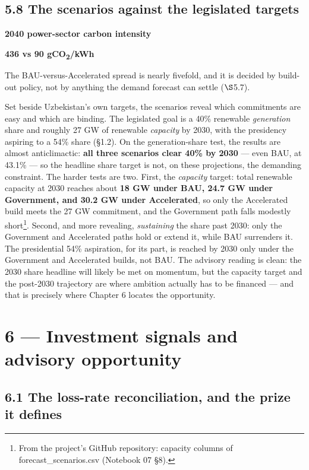 \documentclass[10pt,twocolumn]{article}
\newcommand{\keystat}[3]{%
  \begin{keystatbox}%
  {\footnotesize\bfseries\color{skydeep}#1}\par\vspace{1pt}%
  {\Large\bfseries\color{navy}#2}\par\vspace{2pt}%
  {\footnotesize\color{ink}#3}%
  \end{keystatbox}}
\begin{document}
\subsection*{5.8 The scenarios against the legislated targets}

\keystat{2040 power-sector carbon intensity}{436 vs 90 gCO\textsubscript{2}/kWh}%
{The BAU-versus-Accelerated spread is nearly fivefold, and it is decided by
build-out policy, not by anything the demand forecast can settle ($\S$5.7).}

Set beside Uzbekistan's own targets, the scenarios reveal which commitments are easy and which are binding. The legislated goal is a 40\% renewable \textit{generation} share and roughly 27 GW of renewable \textit{capacity} by 2030, with the presidency aspiring to a 54\% share (\S{}1.2). On the generation-share test, the results are almost anticlimactic: \textbf{all three scenarios clear 40\% by 2030} --- even BAU, at 43.1\% --- so the headline share target is not, on these projections, the demanding constraint. The harder tests are two. First, the \textit{capacity} target: total renewable capacity at 2030 reaches about \textbf{18 GW under BAU, 24.7 GW under Government, and 30.2 GW under Accelerated}, so only the Accelerated build meets the 27 GW commitment, and the Government path falls modestly short\footnote{From the project's GitHub repository: capacity columns of forecast\_scenarios.csv (Notebook 07 \S{}8).}. Second, and more revealing, \textit{sustaining} the share past 2030: only the Government and Accelerated paths hold or extend it, while BAU surrenders it. The presidential 54\% aspiration, for its part, is reached by 2030 only under the Government and Accelerated builds, not BAU. The advisory reading is clean: the 2030 share headline will likely be met on momentum, but the capacity target and the post-2030 trajectory are where ambition actually has to be financed --- and that is precisely where Chapter 6 locates the opportunity.

\section*{6 --- Investment signals and advisory opportunity}

\subsection*{6.1 The loss-rate reconciliation, and the prize it defines}
\end{document}
